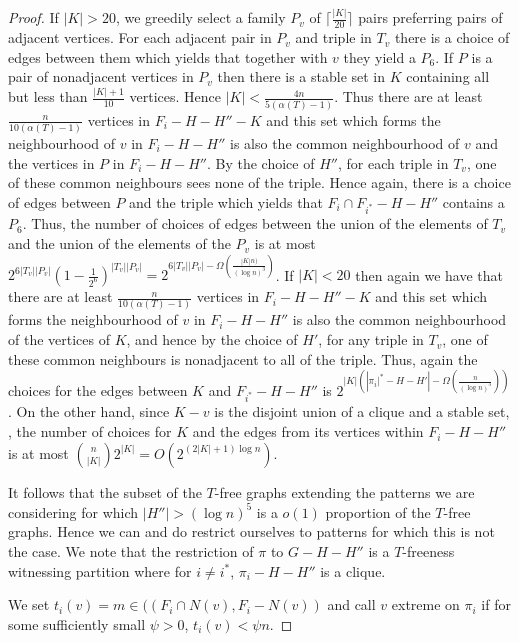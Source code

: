 \documentclass[10pt,a4paper]{amsart}
\begin{document}
\begin{proof}
If $|K| >20$, we greedily  select a family $P_v$   of $\lceil \frac{|K|}{20} \rceil$ pairs 
preferring pairs of adjacent vertices. For each  adjacent pair in $P_v$ and triple in $T_v$ there is a choice of edges between them which yields that together 
with $v$ they yield a $P_6$. If $P$ is a pair of nonadjacent vertices in $P_v$ then there is a stable set in $K$ containing all but  less than $\frac{|K|+1}{10}$
vertices. Hence $|K|<\frac{4n}{5(\alpha(T)-1)}$. Thus there are at least $\frac{n}{10(\alpha(T)-1)}$ vertices in $F_i-H-H''-K$ and this set which forms the neighbourhood of $v$ 
in $F_i-H-H''$ is also the common neighbourhood of $v$ and the vertices in $P$ in $F_i-H-H''$. By the choice of $H''$, for each triple  in $T_v$, one of these common neighbours 
sees none of the triple.  Hence again,  there is a choice of edges between $P$ and the triple  which yields that $F_i \cap F_{i^*}-H-H''$
contains  a $P_6$. Thus, the number of choices of edges between the union of the elements of $T_v$ and the union of the elements 
of the $P_v$ is at most $2^{6|T_v||P_v|}(1-\frac{1}{2^6})^{|T_v||P_v|}=  2^{6|T_v||P_v|- \Omega(\frac{|K|n)}{(\log n)^3})}$. 
If $|K|<20$ then again we have that there are at least $\frac{n}{10(\alpha(T)-1)}$ vertices in $F_i-H-H''-K$ and this set which forms the neighbourhood of $v$ 
in $F_i-H-H''$ is also the common neighbourhood of the vertices of $K$, and hence by the choice of $H'$, for any triple in $T_v$, one of these common neighbours 
is nonadjacent to all of the triple. 
Thus, again the choices for the edges between $K$ and $F_{i^*}-H-H''$ is $2^{|K|(|\pi_i{|^*}-H-H'|-\Omega(\frac{n}{(\log n)^3}))}$. 
On the other hand,  since $K-v$ is the disjoint union of a clique and a stable set, , the number of choices for $K$ and the edges from its vertices within $F_i-H-H''$  is at most ${n \choose |K|}2^{|K|}
=O(2^{(2|K|+1)\log n})$. 

It  follows that the subset of the $T$-free graphs extending the patterns we are considering for which $|H''|>(\log n)^5$ is a $o(1)$ proportion of the $T$-free graphs.
Hence we can and do restrict ourselves to patterns for which this is not the case. We note that  the restriction of $\pi$ to $G-H-H''$ is a $T$-freeness witnessing partition 
where for $i \neq i^*$, $\pi_i-H-H''$ is a clique. 

We set $t_i(v)=m\in((F_i \cap N(v), F_i-N(v))$ and call $v$ extreme on $\pi_i$ if for some sufficiently small $\psi>0$,  $t_i(v)< \psi n$. 


\end{proof}
\end{document}

